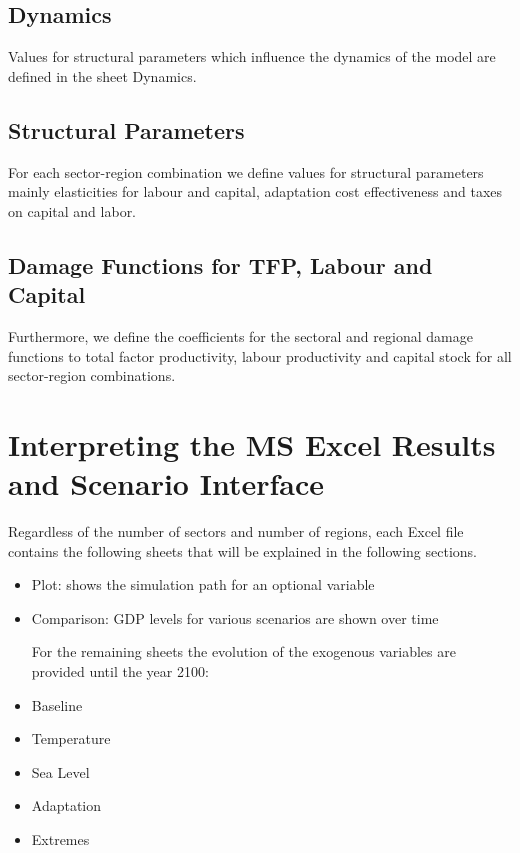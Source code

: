 \documentclass[10pt,a4paper]{article}
\begin{document}
    
\subsection{Dynamics}
Values for structural parameters which influence the dynamics of the model are defined in the sheet Dynamics.
 
\subsection{Structural Parameters}
For each sector-region combination we define values for structural parameters mainly elasticities for labour and capital, adaptation cost effectiveness and taxes on capital and labor.
 
\subsection{Damage Functions for TFP, Labour and Capital}
Furthermore, we define the coefficients for the sectoral and regional damage functions to total factor productivity, labour productivity and capital stock for all sector-region combinations.

\newpage
\section{Interpreting the MS Excel Results and Scenario Interface}

Regardless of the number of sectors and number of regions, each Excel file contains the following sheets that will be explained in the following sections.
\begin{itemize}\setlength{\itemsep}{0pt}
	
	\item Plot: shows the simulation path for an optional variable

	\item Comparison: GDP levels for various scenarios are shown over time 
	
	\vspace{0.5cm}
	For the remaining sheets the evolution of the exogenous variables are provided until the year 2100:
	\item Baseline
	\item Temperature
	\item Sea Level
	\item Adaptation
	\item Extremes

\end{itemize}
\end{document}
